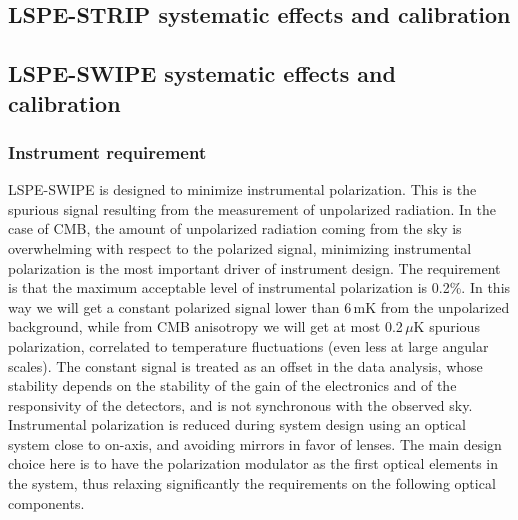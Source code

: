 

\subsection{LSPE-STRIP systematic effects and calibration}


\subsection{LSPE-SWIPE systematic effects and calibration}

\subsubsection{Instrument requirement}


LSPE-SWIPE is designed to minimize instrumental polarization. This is the spurious signal resulting
from the measurement of unpolarized radiation. 
In the case of CMB, the amount of unpolarized radiation coming from
the sky is overwhelming with respect to the polarized signal, minimizing instrumental
polarization is the most important driver of instrument design. 
The requirement is that the
maximum acceptable level of instrumental polarization is 0.2\%. 
In this way we will get a constant
polarized signal lower than 6\,mK from the unpolarized background, while from CMB anisotropy we
will get at most 0.2\,$\mu$K spurious polarization, correlated to temperature fluctuations (even less at large
angular scales). The constant signal is treated as an offset in the data analysis, whose stability depends
on the stability of the gain of the electronics and of the responsivity of the detectors, and is not
synchronous with the observed sky. 
Instrumental polarization is reduced during system design using an
optical system close to on-axis, and avoiding mirrors in favor of lenses. The main design choice here
is to have the polarization modulator as the first optical elements in the system, thus relaxing
significantly the requirements on the following optical components.

